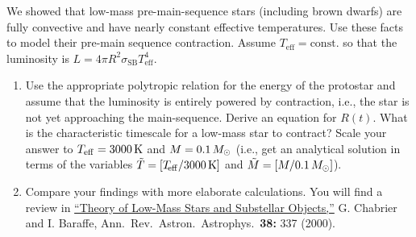 \begin{exercisebox}
We showed that low-mass pre-main-sequence stars (including brown dwarfs) are fully convective and have nearly constant effective temperatures.  Use these facts to model their pre-main sequence contraction.  Assume $T_{\mathrm{eff}} = \mathrm{const.}$ so that the luminosity is $L = 4\pi R^{2} \sigma_{\mathrm{SB}} T_{\mathrm{eff}}^{4}$.

\begin{enumerate}
\item Use the appropriate polytropic relation for the energy of the protostar and assume that the luminosity is entirely powered by contraction, i.e., the star is not yet approaching the main-sequence. Derive an equation for $R(t)$. What is the characteristic timescale for a low-mass star to contract? Scale your answer to $T_{\mathrm{eff}} = 3000\,\mathrm{K}$ and $M = 0.1\,M_\odot$ (i.e., get an analytical solution in terms of the variables $\tilde{T} = [T_{\!\mathrm{eff}}/3000\,\mathrm{K}]$ and $\tilde{M} = [M/0.1\,M_\odot]$).

\item Compare your findings with more elaborate calculations.  You will find a review in \href{http://arxiv.org/abs/astro-ph/0006383}{``Theory of Low-Mass Stars and Substellar Objects,''} G. Chabrier and I. Baraffe, Ann.\ Rev.\ Astron.\ Astrophys.\ \textbf{38:} 337 (2000). 
\end{enumerate}
\end{exercisebox}

